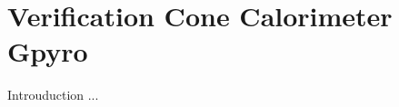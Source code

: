 \documentclass[12pt]{report}
\newcommand{\REFDIR}{Reference_Cone_Calorimmeter} %
\newcommand{\SPATIALDIR}{Spatial_Convergence}     %
\newcommand{\TIMEDIR}{Time_Step_Convergence}      %
\newcommand{\DIMDIR}{Extention_Cone_Calo_2D_3D}  %
\newcommand{\RETCCCONVTHREED}{3D_Lateral_convection}  %
\newcommand{\OMPPARALLELIZATION}{OMP_parallelization}  %
\begin{document}
\fi
\graphicspath{
  {\REFDIR/}    
  {\SPATIALDIR/}
  {\TIMEDIR/} 
  {\DIMDIR/} 
  {\RETCCCONVTHREED/} 
  {\OMPPARALLELIZATION/}  
}



\chapter{ Verification Cone Calorimeter Gpyro}
Introuduction ...

\newpage


\newpage


\newpage


\newpage


\newpage



\ifdefined\ConeCalo
\clearpage
{}


\end{document}
